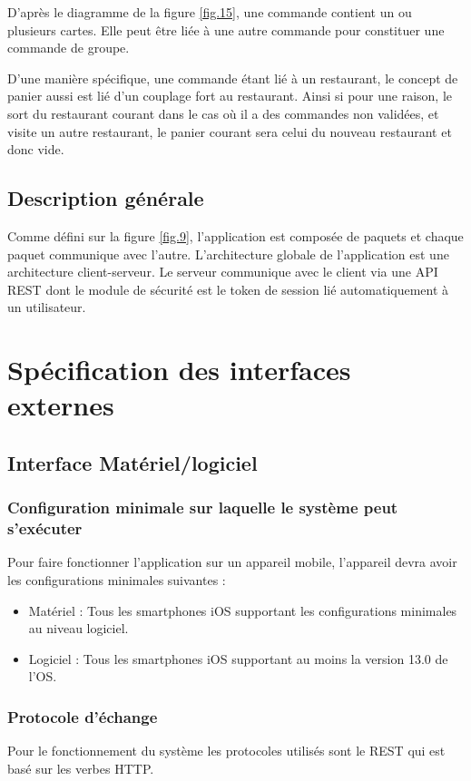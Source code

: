 D'après le diagramme de la figure \ref{fig.15}, une commande contient un ou plusieurs cartes. Elle peut être liée à une autre commande pour constituer une commande de groupe.

D'une manière spécifique, une commande étant lié à un restaurant, le concept de panier aussi est lié d'un couplage fort au restaurant. Ainsi si pour une raison, le \cl sort du restaurant courant dans le cas où il a des commandes non validées, et visite un autre restaurant, le panier courant sera celui du nouveau restaurant et donc vide.

\subsection{Description générale}
Comme défini sur la figure \ref{fig.9}, l'application est composée de paquets et chaque paquet communique avec l'autre. L'architecture globale de l'application est une architecture client-serveur. Le serveur communique avec le client via une API REST dont le module de sécurité est le token de session lié automatiquement à un utilisateur.

\section{Spécification des interfaces externes}
\subsection{Interface Matériel/logiciel}
\subsubsection*{Configuration minimale sur laquelle le système peut s'exécuter}
Pour faire fonctionner l'application sur un appareil mobile, l'appareil devra avoir les configurations minimales suivantes :
\begin{itemize}
	\item Matériel : Tous les smartphones iOS supportant les configurations minimales au niveau logiciel.
	\item Logiciel : Tous les smartphones  iOS supportant au moins la version 13.0 de l'OS.
\end{itemize}

\subsubsection*{Protocole d'échange}
Pour le fonctionnement du système les protocoles utilisés sont le REST qui est basé sur les verbes HTTP.

